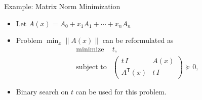 \documentclass[10pt,ignorenonframetext,serif,onlymath]{beamer}
\providecommand{\tightlist}{%
  \setlength{\itemsep}{0pt}\setlength{\parskip}{0pt}}
\begin{document}
\begin{frame}{Example: Matrix Norm Minimization}
\protect\hypertarget{sec:example-matrix-norm-minimization}{}

\begin{itemize}
\tightlist
\item
  Let \(A(x) = A_0 + x_1 A_1 + \cdots + x_n A_n\)
\item
  Problem \(\min_x \| A(x) \|\) can be reformulated as
  \[\begin{array}{ll}
       \text{minimize}      & t, \\
       \text{subject to}    & \left(
   \begin{array}{cc}
    t\,I   & A(x) \\
    A^\mathsf{T}(x) & t\,I
   \end{array} \right) \succeq 0,
   \end{array}\]
\item
  Binary search on \(t\) can be used for this problem.
\end{itemize}

\end{frame}
\end{document}
